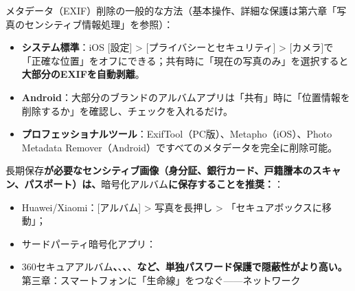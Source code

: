 メタデータ（EXIF）削除の一般的な方法（基本操作、詳細な保護は第六章「写真のセンシティブ情報処理」を参照）：

\begin{itemize}
  \item \textbf{システム標準}：iOS [設定] > [プライバシーとセキュリティ] > [カメラ]で「正確な位置」をオフにできる；共有時に「現在の写真のみ」を選択すると\textbf{大部分のEXIFを自動剥離}。
  \item \textbf{Android}：大部分のブランドのアルバムアプリは「共有」時に「位置情報を削除するか」を確認し、チェックを入れるだけ。
  \item \textbf{プロフェッショナルツール}：ExifTool（PC版）、Metapho（iOS）、Photo Metadata Remover（Android）ですべてのメタデータを完全に削除可能。
\end{itemize}

長期保存\textbf{が必要なセンシティブ画像（身分証、銀行カード、戸籍謄本のスキャン、パスポート）は、}暗号化アルバム\textbf{に保存することを推奨：}：

\begin{itemize}
  \item Huawei/Xiaomi：[アルバム] > 写真を長押し > 「セキュアボックスに移動」；
  \item サードパーティ暗号化アプリ：
  \item 360セキュアアルバム\textbf{、}、\textbf{、}、\textbf{など、単独パスワード保護で隠蔽性がより高い。}第三章：スマートフォンに「生命線」をつなぐ——ネットワーク
\end{itemize}
